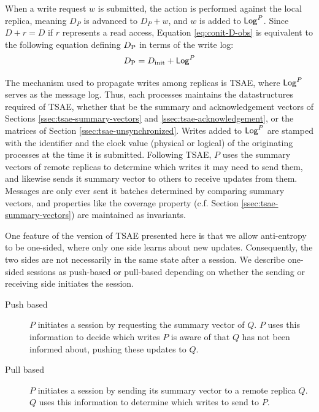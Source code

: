 \documentclass[]             %
{NASA}                       %
\theoremstyle{definition}
\begin{document}
When a write request $w$ is submitted, the action is performed against
the local replica, meaning $D_P$ is advanced to $D_P + w$, and $w$ is
added to $\mathsf{Log}^{P}$. Since $D + r = D$ if $r$ represents a read access,
Equation \eqref{eq:conit-D-obs} is equivalent to the following
equation defining $D_{\textrm{P}}$ in terms of the write log:
\begin{equation}
  D_{\textrm{P}} = D_\textrm{init} + \mathsf{Log}^{P} \label{eq:conit-DP}
\end{equation}

The mechanism used to propagate writes among replicas is TSAE, where
$\mathsf{Log}^{P}$ serves as the message log. Thus, each processes maintains the
datastructures required of TSAE, whether that be the summary and
acknowledgement vectors of Sections \ref{ssec:tsae-summary-vectors}
and \ref{ssec:tsae-acknowledgement}, or the matrices of Section
\ref{ssec:tsae-unsynchronized}. Writes added to $\mathsf{Log}^{P}$ are stamped
with the identifier and the clock value (physical or logical) of the
originating processes at the time it is submitted. Following TSAE, $P$
uses the summary vectors of remote replicas to determine which writes
it may need to send them, and likewise sends it summary vector to
others to receive updates from them. Messages are only ever sent it
batches determined by comparing summary vectors, and properties like
the coverage property (c.f. Section \ref{ssec:tsae-summary-vectors})
are maintained as invariants.

One feature of the version of TSAE presented here is that we allow
anti-entropy to be one-sided, where only one side learns about new
updates. Consequently, the two sides are not necessarily in the same
state after a session. We describe one-sided sessions as push-based or
pull-based depending on whether the sending or receiving side
initiates the session.
\begin{description}
\item[Push based] $P$ initiates a session by requesting the summary
  vector of $Q$. $P$ uses this information to decide which writes $P$
  is aware of that $Q$ has not been informed about, pushing these
  updates to $Q$.
\item[Pull based] $P$ initiates a session by sending its summary
  vector to a remote replica $Q$. $Q$ uses this information to
  determine which writes to send to $P$.
\end{description}
\end{document}
